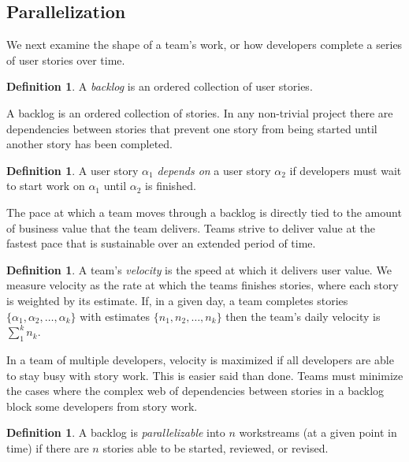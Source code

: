\documentclass[letterpaper]{article}
\theoremstyle{definition}
\newtheorem{definition}[theorem]{Definition}
\begin{document}
    \subsection{Parallelization}\label{subsec:parallelization}

    We next examine the shape of a team's work, or how developers complete a series of user stories over time.

    \begin{definition}
        A \textit{backlog} is an ordered collection of user stories.
    \end{definition}

    A backlog is an ordered collection of stories.
    In any non-trivial project there are dependencies between stories that prevent one story from being started until
    another story has been completed.

    \begin{definition}
        A user story $\alpha_1$ \textit{depends on} a user story $\alpha_2$ if developers must wait to start work on
        $\alpha_1$ until $\alpha_2$ is finished.
    \end{definition}

    The pace at which a team moves through a backlog is directly tied to the amount of business value that the team
    delivers.
    Teams strive to deliver value at the fastest pace that is sustainable over an extended period of time.

    \begin{definition}
        A team's \textit{velocity} is the speed at which it delivers user value.
        We measure velocity as the rate at which the teams finishes stories, where each story is weighted by its
        estimate.
        If, in a given day, a team completes stories $\{\alpha_1, \alpha_2,\dots,\alpha_k\}$ with estimates
        $\{n_1, n_2,\dots,n_k\}$ then the team's daily velocity is $\sum_1^k n_k$.
    \end{definition}

    In a team of multiple developers, velocity is maximized if all developers are able to stay busy with story work.
    This is easier said than done.
    Teams must minimize the cases where the complex web of dependencies between stories in a backlog block some
    developers from story work.

    \begin{definition}
        A backlog is \textit{parallelizable} into $n$ workstreams (at a given point in time) if there are $n$ stories
        able to be started, reviewed, or revised.
    \end{definition}
\end{document}
